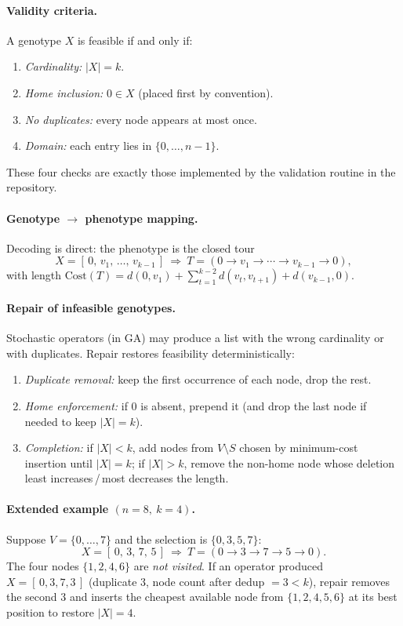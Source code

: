 \documentclass[conference]{IEEEtran}
\begin{document}
\paragraph{Validity criteria.}
A genotype $X$ is feasible if and only if:
\begin{enumerate}
  \item \emph{Cardinality:} $|X|=k$.
  \item \emph{Home inclusion:} $0\in X$ (placed first by convention).
  \item \emph{No duplicates:} every node appears at most once.
  \item \emph{Domain:} each entry lies in $\{0,\dots,n-1\}$.
\end{enumerate}
These four checks are exactly those implemented by the validation routine in the repository.

\paragraph{Genotype $\rightarrow$ phenotype mapping.}
Decoding is direct: the phenotype is the closed tour
\[
  X=[\,0,\,v_1,\,\dots,\,v_{k-1}\,]\ \Longrightarrow\
  T=(0\to v_1\to\cdots\to v_{k-1}\to 0),
\]
with length $\mathrm{Cost}(T)=d(0,v_1)+\sum_{t=1}^{k-2} d(v_t,v_{t+1})+d(v_{k-1},0)$.

\paragraph{Repair of infeasible genotypes.}
Stochastic operators (in GA) may produce a list with the wrong cardinality or with duplicates. Repair restores feasibility deterministically:
\begin{enumerate}
  \item \emph{Duplicate removal:} keep the first occurrence of each node, drop the rest.
  \item \emph{Home enforcement:} if $0$ is absent, prepend it (and drop the last node if needed to keep $|X|=k$).
  \item \emph{Completion:} if $|X|<k$, add nodes from $V\setminus S$ chosen by minimum-cost insertion until $|X|=k$; if $|X|>k$, remove the non-home node whose deletion least increases\,/\,most decreases the length.
\end{enumerate}

\paragraph{Extended example $(n=8,\ k=4)$.}
Suppose $V=\{0,\dots,7\}$ and the selection is $\{0,3,5,7\}$:
\[
  X=[\,0,\,3,\,7,\,5\,]\ \Longrightarrow\ T=(0\to 3\to 7\to 5\to 0).
\]
The four nodes $\{1,2,4,6\}$ are \emph{not visited}. If an operator produced $X=[\,0,3,7,3\,]$ (duplicate $3$, node count after dedup $=3<k$), repair removes the second $3$ and inserts the cheapest available node from $\{1,2,4,5,6\}$ at its best position to restore $|X|=4$.
\end{document}
